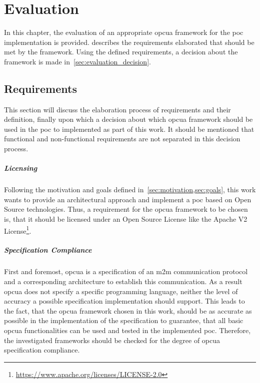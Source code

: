 \documentclass[
a4paper,
twoside,
headsepline,
cleardoublepage=empty,
parskip=half,
draft=false
]{scrbook}
\begin{document}
			
	\chapter{Evaluation}\label{ch:evaluation}
	
		In this chapter, the evaluation of an appropriate \gls{opcua} framework for the \gls{poc} implementation is provided.  describes the requirements elaborated that should be met by the framework. 
		Using the defined requirements, a decision about the framework is made in~\cref{sec:evaluation_decision}.
		
		\section{Requirements}\label{sec:evaluation_requirements}
		
			This section will discuss the elaboration process of requirements and their definition, finally upon which a decision about which \gls{opcua} framework should be used in the \gls{poc} to implemented as part of this work. 
			It should be mentioned that functional and non-functional requirements are not separated in this decision process.
			
			\paragraph{Licensing} Following the motivation and goals defined in~\cref{sec:motivation,sec:goals}, this work wants to provide an architectural approach and implement a \gls{poc} based on Open Source technologies.
			Thus, a requirement for the \gls{opcua} framework to be chosen is, that it should be licensed under an Open Source License like the Apache V2 License\footnote{\url{https://www.apache.org/licenses/LICENSE-2.0}}.
			
			\paragraph{Specification Compliance} First and foremost, \gls{opcua} is a specification of an \gls{m2m} communication protocol and a corresponding architecture to establish this communication. 
			As a result \gls{opcua} does not specify a specific programming language, neither the level of accuracy a possible specification implementation should support. 
			This leads to the fact, that the \gls{opcua} framework chosen in this work, should be as accurate as possible in the implementation of the specification to guarantee, that all basic \gls{opcua} functionalities can be used and tested in the implemented \gls{poc}. 
			Therefore, the investigated frameworks should be checked for the degree of \gls{opcua} specification compliance.
			
\end{document}
